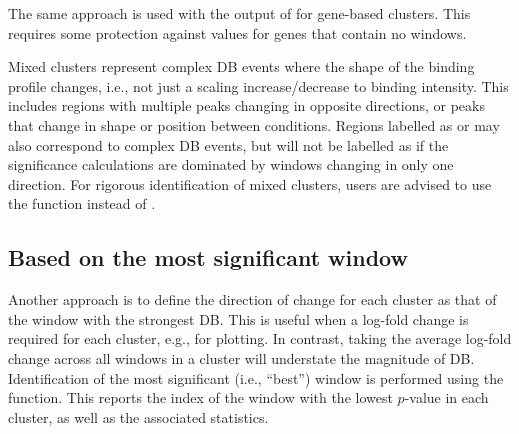\documentclass{report}\usepackage[]{graphicx}\usepackage[usenames,dvipsnames]{color}
\newcommand{\hlnum}[1]{\textcolor[rgb]{0.816,0.125,0.439}{#1}}%
\newcommand{\hlopt}[1]{\textcolor[rgb]{0,0,0}{#1}}%
\newcommand{\hlstd}[1]{\textcolor[rgb]{0.251,0.251,0.251}{#1}}%
\newcommand{\hlkwb}[1]{\textcolor[rgb]{0,0,0}{#1}}%
\newcommand{\hlkwd}[1]{\textcolor[rgb]{0.878,0.439,0.125}{#1}}%
\newenvironment{knitrout}{}{} %
\begin{document}
\begin{knitrout}
\color{fgcolor}
\end{knitrout}

The same approach is used with the output of  for gene-based clusters.
This requires some protection against  values for genes that contain no windows.

\begin{knitrout}
\color{fgcolor}
\end{knitrout}

Mixed clusters represent complex DB events where the shape of the binding profile changes, i.e., not just a scaling increase/decrease to binding intensity.
This includes regions with multiple peaks changing in opposite directions, or peaks that change in shape or position between conditions.
Regions labelled as  or  may also correspond to complex DB events,
but will not be labelled as  if the significance calculations are dominated by windows changing in only one direction.
For rigorous identification of mixed clusters, users are advised to use the  function instead of .

\subsection{Based on the most significant window}
Another approach is to define the direction of change for each cluster as that of the window with the strongest DB.
This is useful when a log-fold change is required for each cluster, e.g., for plotting.
In contrast, taking the average log-fold change across all windows in a cluster will understate the magnitude of DB.
Identification of the most significant (i.e., ``best'') window is performed using the  function.
This reports the index of the window with the lowest $p$-value in each cluster, as well as the associated statistics.
\end{document}
